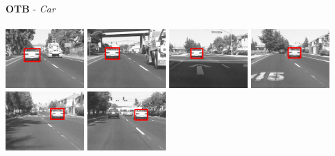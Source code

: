 \documentclass[10pt,twocolumn,letterpaper,french]{article}
\begin{document}
\begin{appendices}
\begin{center}
  \textbf{OTB} - \textit{Car}\\
  \hspace{1cm}\\
  \includegraphics[width=85pt]{images/exemples/ok/car/000001.png}
  \includegraphics[width=85pt]{images/exemples/ok/car/000310.png}
  \includegraphics[width=85pt]{images/exemples/ok/car/000454.png}
  \includegraphics[width=85pt]{images/exemples/ok/car/000546.png}
  \includegraphics[width=85pt]{images/exemples/ok/car/000727.png}
  \includegraphics[width=85pt]{images/exemples/ok/car/000888.png}\\
  \hspace{1cm}\\
  \hspace{1cm}\\


\end{center}
\end{appendices}
\end{document}

